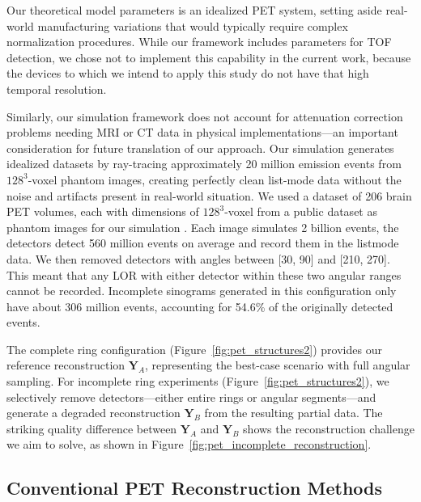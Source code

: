 \documentclass[12pt]{iopart}
\begin{document}
Our theoretical model parameters is an idealized PET system, setting aside real-world manufacturing variations that would typically require complex normalization procedures. 
While our framework includes parameters for TOF detection, we chose not to implement this capability in the current work, because the devices to which we intend to apply this study do not have that high temporal resolution. 

Similarly, our simulation framework does not account for attenuation correction problems needing MRI or CT data in physical implementations—an important consideration for future translation of our approach. Our simulation generates idealized datasets by ray-tracing approximately 20 million emission events from $128^3$-voxel phantom images, creating perfectly clean list-mode data without the noise and artifacts present in real-world situation. 
We used a dataset of 206 brain PET volumes, each with dimensions of $128^3$-voxel from a public dataset as phantom images for our simulation \cite{Han2023DiffusionPET}. Each image simulates 2 billion events, the detectors detect 560 million events on average and record them in the listmode data. We then removed detectors with angles between [30\degree, 90\degree] and [210\degree, 270\degree]. This meant that any LOR with either detector within these two angular ranges cannot be recorded. Incomplete sinograms generated in this configuration only have about 306 million events, accounting for 54.6\% of the originally detected events.

The complete ring configuration (Figure~\ref{fig:pet_structures2}) provides our reference reconstruction $\mathbf{Y}_A$, representing the best-case scenario with full angular sampling. For incomplete ring experiments (Figure~\ref{fig:pet_structures2}), we selectively remove detectors—either entire rings or angular segments—and generate a degraded reconstruction $\mathbf{Y}_B$ from the resulting partial data. The striking quality difference between $\mathbf{Y}_A$ and $\mathbf{Y}_B$ shows the reconstruction challenge we aim to solve, as shown in Figure~\ref{fig:pet_incomplete_reconstruction}.

\subsection{Conventional PET Reconstruction Methods}
\end{document}
